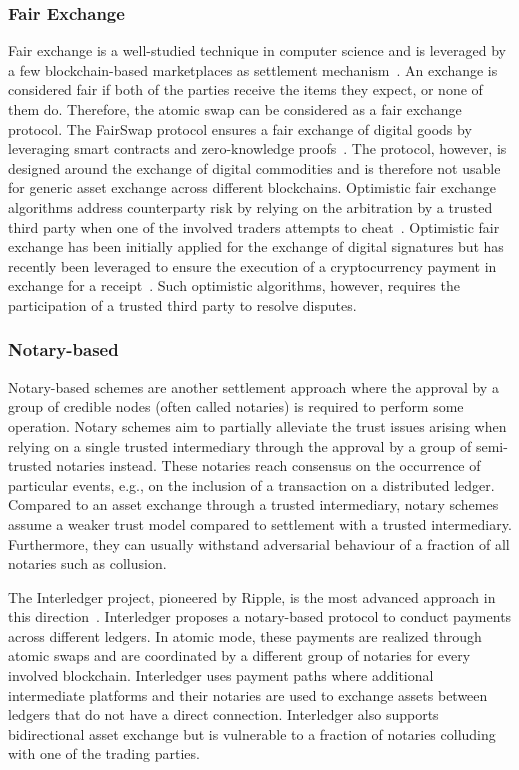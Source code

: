 \subsubsection{Fair Exchange}
Fair exchange is a well-studied technique in computer science and is leveraged by a few blockchain-based marketplaces as settlement mechanism~\cite{pagnia2003fair}.
An exchange is considered fair if both of the parties receive the items they expect, or none of them do.
Therefore, the atomic swap can be considered as a fair exchange protocol.
The FairSwap protocol ensures a fair exchange of digital goods by leveraging smart contracts and zero-knowledge proofs~\cite{dziembowski2018fairswap}.
The protocol, however, is designed around the exchange of digital commodities and is therefore not usable for generic asset exchange across different blockchains.
Optimistic fair exchange algorithms address counterparty risk by relying on the arbitration by a trusted third party when one of the involved traders attempts to cheat~\cite{asokan1997optimistic}.
Optimistic fair exchange has been initially applied for the exchange of digital signatures but has recently been leveraged to ensure the execution of a cryptocurrency payment in exchange for a receipt~\cite{liu2018toward}.
Such optimistic algorithms, however, requires the participation of a trusted third party to resolve disputes.

\subsubsection{Notary-based}
Notary-based schemes are another settlement approach where the approval by a group of credible nodes (often called notaries) is required to perform some operation.
Notary schemes aim to partially alleviate the trust issues arising when relying on a single trusted intermediary through the approval by a group of semi-trusted notaries instead.
These notaries reach consensus on the occurrence of particular events, e.g., on the inclusion of a transaction on a distributed ledger.
Compared to an asset exchange through a trusted intermediary, notary schemes assume a weaker trust model compared to settlement with a trusted intermediary. Furthermore, they can usually withstand adversarial behaviour of a fraction of all notaries such as collusion.

The Interledger project, pioneered by Ripple, is the most advanced approach in this direction~\cite{thomas2015protocol}.
Interledger proposes a notary-based protocol to conduct payments across different ledgers.
In atomic mode, these payments are realized through atomic swaps and are coordinated by a different group of notaries for every involved blockchain.
Interledger uses payment paths where additional intermediate platforms and their notaries are used to exchange assets between ledgers that do not have a direct connection.
Interledger also supports bidirectional asset exchange but is vulnerable to a fraction of notaries colluding with one of the trading parties.

